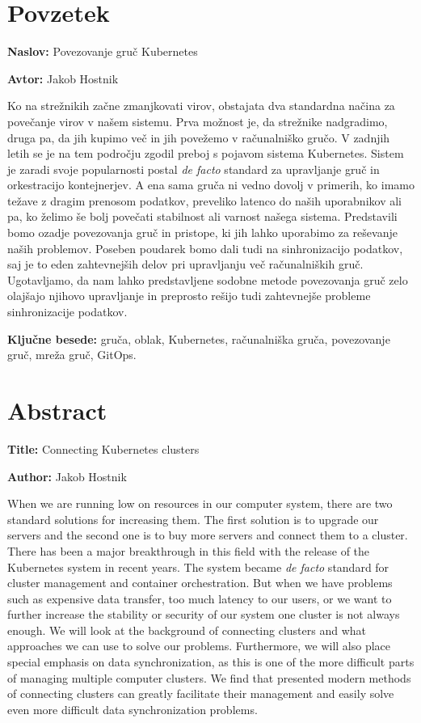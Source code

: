 \documentclass[a4paper, 12pt]{book}
\newcommand{\ttitle}{Povezovanje gruč Kubernetes}
\newcommand{\ttitleEn}{Connecting Kubernetes clusters}
\newcommand{\tauthor}{Jakob Hostnik}
\newcommand{\tkeywords}{gruča, oblak, Kubernetes, računalniška gruča, povezovanje gruč, mreža gruč, GitOps}
\newcommand{\clearemptydoublepage}{\newpage{\pagestyle{empty}\cleardoublepage}}
\begin{document}
\chapter*{Povzetek}
\noindent\textbf{Naslov:} \ttitle
\bigskip

\noindent\textbf{Avtor:} \tauthor
\bigskip
\noindent 

Ko na strežnikih začne zmanjkovati virov, obstajata dva standardna na\-či\-na za povečanje virov v našem sistemu.
Prva možnost je, da strežnike nadgradimo, druga pa, da jih kupimo več in jih povežemo v računalniško gručo.
V zadnjih letih se je na tem področju zgodil preboj s pojavom sistema Kubernetes.
Sistem je zaradi svoje popularnosti postal \emph{de facto} standard za upravljanje gruč in orkestracijo kontejnerjev.
A ena sama gruča ni vedno dovolj v primerih, ko imamo težave z dragim prenosom podatkov, preveliko latenco do naših uporabnikov ali pa, ko želimo še bolj povečati stabilnost ali varnost našega sistema.
Predstavili bomo ozadje povezovanja gruč in pristope, ki jih lahko uporabimo za reševanje naših problemov.
Poseben poudarek bomo dali tudi na sinhronizacijo podatkov, saj je to eden zahtevnejših delov pri upravljanju več računalniških gruč.
Ugotavljamo, da nam lahko predstavljene sodobne metode povezovanja gruč zelo olajšajo njihovo upravljanje in preprosto rešijo tudi zahtevnejše probleme sinhronizacije podatkov.

\bigskip
\noindent\textbf{Ključne besede:} \tkeywords.
\clearemptydoublepage
\chapter*{Abstract}
\noindent\textbf{Title:} \ttitleEn
\bigskip

\noindent\textbf{Author:} \tauthor
\bigskip
\noindent 

When we are running low on resources in our computer system, there are two standard solutions for increasing them.
The first solution is to upgrade our servers and the second one is to buy more servers and connect them to a cluster.
There has been a major breakthrough in this field with the release of the Kubernetes system in recent years.
The system became \emph{de facto} standard for cluster management and container orchestration.
But when we have problems such as expensive data transfer, too much latency to our users, or we want to further increase the stability or security of our system one cluster is not always enough.
We will look at the background of connecting clusters and what approaches we can use to solve our problems.
Furthermore, we will also place special emphasis on data synchronization, as this is one of the more difficult parts of managing multiple computer clusters.
We find that presented modern methods of connecting clusters can greatly facilitate their management and easily solve even more difficult data synchronization problems.
\end{document}
